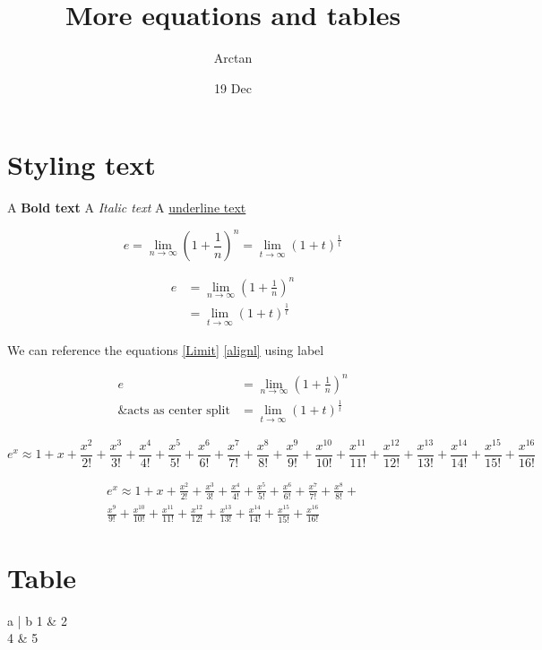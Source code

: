 \documentclass{article}
\title{More equations and tables}
\author{Arctan}
\date{19 Dec}
\begin{document}
\maketitle

\section{Styling text}

A \textbf{Bold text}
A \textit{Italic text}
A \underline{underline text}

    \begin{equation}
    \label{Limit}
        e = \lim_{n\to\infty}\left(1+\frac{1}{n}\right)^n
          = \lim_{t\to\infty}(1+t)^\frac{1}{t}
    \end{equation}

    \begin{align}
    \label{alignl}
        e& = \lim_{n\to\infty}\left(1+\frac{1}{n}\right)^n \\ 
          &= \lim_{t\to\infty}(1+t)^\frac{1}{t}
    \end{align}

    We can reference the equations \ref{Limit} \ref{alignl} using label 

    \begin{equation}
    \begin{split}
        e &= \lim_{n\to\infty}\left(1+\frac{1}{n}\right)^n \\
        \text{\& acts as center split}  &= \lim_{t\to\infty}(1+t)^\frac{1}{t}
    \end{split} 
    \end{equation}

    \begin{equation}
        e^x \approx 1 + x + \frac{x^2}{2!} + \frac{x^3}{3!}+ \frac{x^4}{4!}+ \frac{x^5}{5!}+ \frac{x^6}{6!}+ \frac{x^7}{7!}+ \frac{x^8}{8!}+ \frac{x^9}{9!}+ \frac{x^10}{10!}+ \frac{x^11}{11!}+ \frac{x^12}{12!}+ \frac{x^13}{13!}+ \frac{x^14}{14!}+ \frac{x^15}{15!}+ \frac{x^16}{16!}
    \end{equation}

    \begin{multline}
        e^x \approx 1 + x + \frac{x^2}{2!} + \frac{x^3}{3!}+ \frac{x^4}{4!}+ \frac{x^5}{5!}+ \frac{x^6}{6!}+ \frac{x^7}{7!}+ \frac{x^8}{8!}+ \\ \frac{x^9}{9!}+ \frac{x^10}{10!}+ \frac{x^11}{11!}+ \frac{x^12}{12!}+ \frac{x^13}{13!}+ \frac{x^14}{14!}+ \frac{x^15}{15!}+ \frac{x^16}{16!}
    \end{multline}

    \section{Table}

    \begin{tabular}{a | b}
        1 & 2 \\
        4 & 5
    \end{tabular}
\end{document}
